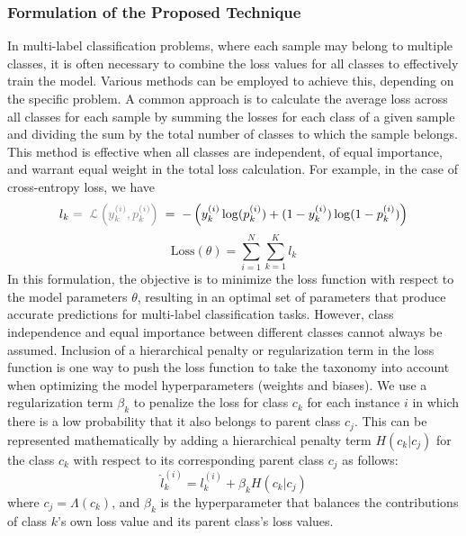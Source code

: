 \subsubsection{Formulation of the Proposed Technique}
In multi-label classification problems, where each sample may belong to multiple classes, it is often necessary to combine the loss values for all classes to effectively train the model. Various methods can be employed to achieve this, depending on the specific problem. A common approach is to calculate the average loss across all classes for each sample by summing the losses for each class of a given sample and dividing the sum by the total number of classes to which the sample belongs. This method is effective when all classes are independent, of equal importance, and warrant equal weight in the total loss calculation. For example, in the case of cross-entropy loss, we have
\begin{equation}
    l_k \textcolor{gray}{\; = \; \mathcal{L} \left(y_k^{(i)},p_k^{(i)}\right)} \; = \; -\left(y_k^{(i)}\log(p_k^{(i)}) + (1 - y_k^{(i)})\log(1 - p_k^{(i)})\right)
    \label{eq:taxonomy.eq.2.loss}
\end{equation}
\begin{equation}
    \text{Loss}(\theta) = \sum_{i=1}^{N}\sum_{k=1}^{K}l_k
    \label{eq:taxonomy.eq.3.totalloss}
\end{equation}
In this formulation, the objective is to minimize the loss function with respect to the model parameters $\theta $, resulting in an optimal set of parameters that produce accurate predictions for multi-label classification tasks. However, class independence and equal importance between different classes cannot always be assumed. Inclusion of a hierarchical penalty or regularization term in the loss function is one way to push the loss function to take the taxonomy into account when optimizing the model hyperparameters (weights and biases). We use a regularization term $\beta_k$  to penalize the loss for class $c_k$ for each instance $i $ in which there is a low probability that it also belongs to parent class $c_j$. This can be represented mathematically by adding a hierarchical penalty term $H(c_k \vert c_j)$ for the class $c_k$ with respect to its corresponding parent class $c_j$ as follows:
\begin{equation}
    \widehat{l}_{k}^{(i)} = l_{k}^{(i)}+\beta_k H \left(c_k \vert c_j \right)
    \label{eq:taxonomy.eq.3.newloss}
\end{equation}
where $c_j=\Lambda(c_k)$, and $\beta_k $ is the hyperparameter that balances the contributions of class $k$'s own loss value and its parent class's loss values.

